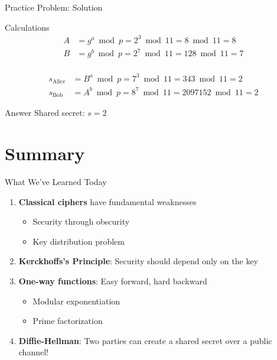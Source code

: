 \documentclass{beamer}
\begin{document}
\begin{frame}{Practice Problem: Solution}
\begin{block}{Calculations}
\begin{align*}
A &= g^a \bmod p = 2^3 \bmod 11 = 8 \bmod 11 = 8 \\
B &= g^b \bmod p = 2^7 \bmod 11 = 128 \bmod 11 = 7 \\
\end{align*}

\pause

\begin{align*}
s_{\text{Alice}} &= B^a \bmod p = 7^3 \bmod 11 = 343 \bmod 11 = 2 \\
s_{\text{Bob}} &= A^b \bmod p = 8^7 \bmod 11 = 2097152 \bmod 11 = 2
\end{align*}
\end{block}

\pause

\begin{exampleblock}{Answer}
Shared secret: $s = 2$
\end{exampleblock}
\end{frame}

\section{Summary}

\begin{frame}{What We've Learned Today}
\begin{enumerate}
    \item \textbf{Classical ciphers} have fundamental weaknesses
    \begin{itemize}
        \item Security through obscurity
        \item Key distribution problem
    \end{itemize}
    
    \pause
    
    \item \textbf{Kerckhoffs's Principle}: Security should depend only on the key
    
    \pause
    
    \item \textbf{One-way functions}: Easy forward, hard backward
    \begin{itemize}
        \item Modular exponentiation
        \item Prime factorization
    \end{itemize}
    
    \pause
    
    \item \textbf{Diffie-Hellman}: Two parties can create a shared secret over a public channel!
\end{enumerate}
\end{frame}
\end{document}
